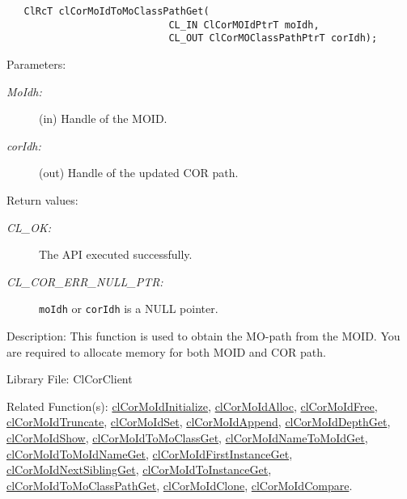 \begin{flushleft}
\begin{Desc}
\footnotesize\begin{verbatim}   ClRcT clCorMoIdToMoClassPathGet(
                 			CL_IN ClCorMOIdPtrT moIdh,
                 			CL_OUT ClCorMOClassPathPtrT corIdh);
\end{verbatim}
\normalsize
\end{Desc}
\begin{Desc}
\item[Parameters:]
\begin{description}
\item[{\em MoIdh:}](in) Handle of the MOID. 
\item[{\em cor\-Idh:}](out) Handle of the updated COR path.\end{description}
\end{Desc}
\begin{Desc}
\item[Return values:]
\begin{description}
\item[{\em CL\_\-OK:}]The API executed successfully.
\item[{\em CL\_\-COR\_\-ERR\_\-NULL\_\-PTR:}] {\tt{moIdh}} or {\tt{corIdh}} is a NULL pointer.
\end{description}
\end{Desc}
\begin{Desc}
\item[Description:]This function is used to obtain the MO-path from the MOID. You are required to allocate memory for both MOID and COR path. 
\end{Desc}
\begin{Desc}
\item[Library File:]Cl\-Cor\-Client\end{Desc}
\begin{Desc}
\item[Related Function(s):]\hyperlink{pagecor100}{cl\-Cor\-MoId\-Initialize}, \hyperlink{pagecor113}{cl\-Cor\-MoId\-Alloc}, 
\hyperlink{pagecor114}{cl\-Cor\-MoId\-Free},
\hyperlink{pagecor115}{cl\-Cor\-MoId\-Truncate}, 
\hyperlink{pagecor116}{cl\-Cor\-MoId\-Set}, 
\hyperlink{pagecor117}{cl\-Cor\-MoId\-Append}, 
\hyperlink{pagecor118}{cl\-Cor\-MoId\-Depth\-Get}, 
\hyperlink{pagecor119}{cl\-Cor\-MoId\-Show}, 
\hyperlink{pagecor120}{cl\-Cor\-MoId\-To\-Mo\-Class\-Get}, 
\hyperlink{pagecor121}{cl\-Cor\-MoId\-Name\-To\-MoId\-Get}, 
\hyperlink{pagecor122}{cl\-Cor\-MoId\-To\-MoId\-Name\-Get}, 
\hyperlink{pagecor123}{cl\-Cor\-MoId\-First\-Instance\-Get},
\hyperlink{pagecor124}{cl\-Cor\-MoId\-Next\-Sibling\-Get}, 
\hyperlink{pagecor125}{cl\-Cor\-MoId\-To\-Instance\-Get}, 
\hyperlink{pagecor126}{cl\-Cor\-MoId\-To\-Mo\-Class\-Path\-Get}, 
\hyperlink{pagecor127}{cl\-Cor\-MoId\-Clone}, 
\hyperlink{pagecor128}{cl\-Cor\-MoId\-Compare}.\end{Desc}
\newpage




\end{flushleft}
